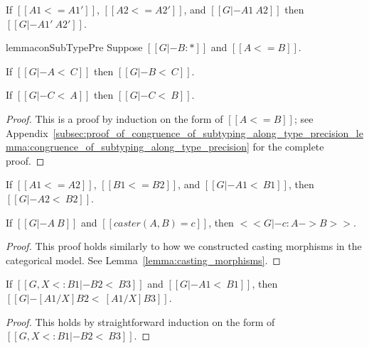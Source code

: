 \begin{corollary}
  \label{corollary:congruence_of_type_consistency_along_type_precision}
  If $[[A1 <= A1']]$, $[[A2 <= A2']]$, and $[[G |- A1 ~ A2]]$ then
  $[[G |- A1' ~ A2']]$.  
\end{corollary}

\begin{restatable}{lemma}{conSubTypePre}
\label{lemma:congruence_of_subtyping_along_type_precision}
  Suppose $[[G |- B : *]]$ and $[[A <= B]]$.
  \begin{enumR}
  \item If $[[G |- A <~ C]]$ then $[[G |- B <~ C]]$.

  \item If $[[G |- C <~ A]]$ then $[[G |- C <~ B]]$.  
  \end{enumR}  
\end{restatable}
\begin{proof}
  This is a proof by induction on the form of $[[A <= B]]$; see
  Appendix~\ref{subsec:proof_of_congruence_of_subtyping_along_type_precision_lemma:congruence_of_subtyping_along_type_precision}
  for the complete proof.
\end{proof}

\begin{corollary}
  \label{corollary:congruence_of_subtyping_along_type_precision}
  If $[[A1 <= A2]]$, $[[B1 <= B2]]$, and $[[G |- A1 <~ B1]]$, then $[[G |- A2 <~ B2]]$.
\end{corollary}

\begin{lemma}
  \label{lemma:typing_casting_morphisms}
  If $[[G |- A ~ B]]$ and $[[caster(A,B) = c]]$, then $<<G |- c : A -> B>>$.
\end{lemma}
\begin{proof}
  This proof holds similarly to how we constructed casting morphisms in the categorical
  model.  See Lemma~\ref{lemma:casting_morphisms}.
\end{proof}

\begin{lemma}
  \label{lemma:substitution_for_consistent_subtyping}
  If $[[G, X <: B1 |- B2 <~ B3]]$ and $[[G |- A1 <~ B1]]$, then $[[G |- [A1/X]B2 <~ [A1/X]B3]]$.
\end{lemma}
\begin{proof}
  This holds by straightforward induction on the form of $[[G, X <: B1 |- B2 <~ B3]]$.
\end{proof}

